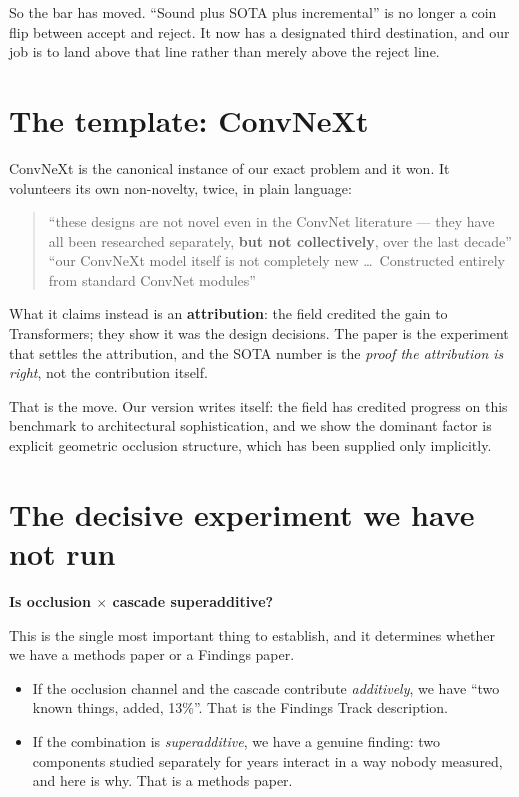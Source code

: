 \documentclass[10pt,a4paper]{article}
\begin{document}
So the bar has moved. ``Sound plus SOTA plus incremental'' is no longer a coin flip
between accept and reject. It now has a designated third destination, and our job is to
land above that line rather than merely above the reject line.

\section{The template: ConvNeXt}

ConvNeXt is the canonical instance of our exact problem and it won. It volunteers its own
non-novelty, twice, in plain language:

\begin{quote}
``these designs are not novel even in the ConvNet literature — they have all been
researched separately, \textbf{but not collectively}, over the last decade''\\[1mm]
``our ConvNeXt model itself is not completely new \ldots\ Constructed entirely from
standard ConvNet modules''
\end{quote}

What it claims instead is an \textbf{attribution}: the field credited the gain to
Transformers; they show it was the design decisions. The paper is the experiment that
settles the attribution, and the SOTA number is the \emph{proof the attribution is right},
not the contribution itself.

That is the move. Our version writes itself: the field has credited progress on this
benchmark to architectural sophistication, and we show the dominant factor is explicit
geometric occlusion structure, which has been supplied only implicitly.

\section{The decisive experiment we have not run}

\textbf{Is occlusion $\times$ cascade superadditive?}

This is the single most important thing to establish, and it determines whether we have a
methods paper or a Findings paper.

\begin{itemize}
\item If the occlusion channel and the cascade contribute \emph{additively}, we have
``two known things, added, 13\%''. That is the Findings Track description.
\item If the combination is \emph{superadditive}, we have a genuine finding: two
components studied separately for years interact in a way nobody measured, and here is
why. That is a methods paper.
\end{itemize}
\end{document}
